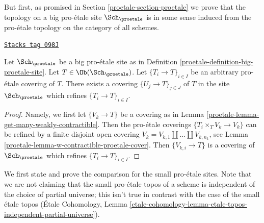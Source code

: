 \medskip\noindent
But first,
as promised in Section \ref{proetale-section-proetale} we prove that the topology on a
big pro-\'etale site $\Sch_\proetale$ is in some sense induced from
the pro-\'etale topology on the category of all schemes.

\begin{lemma}
\label{proetale-lemma-proetale-induced}
\href{https://stacks.math.columbia.edu/tag/098J}{\texttt{Stacks tag 098J}}

Let $\Sch_\proetale$ be a big pro-\'etale site as in
Definition \ref{proetale-definition-big-proetale-site}.
Let $T \in \Ob(\Sch_\proetale)$.
Let $\{T_i \to T\}_{i \in I}$ be an arbitrary pro-\'etale covering of $T$.
There exists a covering $\{U_j \to T\}_{j \in J}$ of $T$ in the site
$\Sch_\proetale$ which refines $\{T_i \to T\}_{i \in I}$.
\end{lemma}

\begin{proof}

Namely, we first let $\{V_k \to T\}$ be a covering as in
Lemma \ref{proetale-lemma-get-many-weakly-contractible}.
Then the pro-\'etale coverings $\{T_i \times_T V_k \to V_k\}$
can be refined by a finite disjoint open covering
$V_k = V_{k, 1} \amalg \ldots \amalg V_{k, n_k}$, see
Lemma \ref{proetale-lemma-w-contractible-proetale-cover}.
Then $\{V_{k, i} \to T\}$ is a covering of $\Sch_\proetale$
which refines $\{T_i \to T\}_{i \in I}$.
\end{proof}

We first state and prove the comparison for the small pro-\'etale
sites. Note that we are not claiming that the small pro-\'etale topos
of a scheme is independent of the choice of partial universe; this isn't
true in contrast with the case of the small \'etale topos
(\'Etale Cohomology, Lemma
\ref{etale-cohomology-lemma-etale-topos-independent-partial-universe}).

